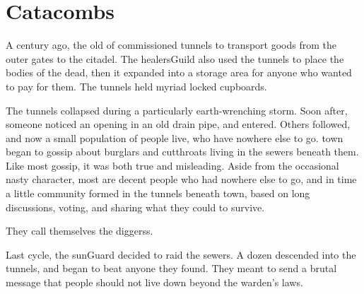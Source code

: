 \section{ Catacombs}
\label{sewers}


\begin{multicols}{2}

\begin{exampletext}
  \noindent
  A century ago, the old  of  commissioned tunnels to transport goods from the outer gates to the citadel.
  The \gls{healersGuild} also used the tunnels to place the bodies of the dead, then it expanded into a storage area for anyone who wanted to pay for them.
  The tunnels held myriad locked cupboards.


  The tunnels collapsed during a particularly earth-wrenching \gls{storm}.
  Soon after, someone noticed an opening in an old drain pipe, and entered.
  Others followed, and now a small population of people live, who have nowhere else to go.
  \Gls{town} began to gossip about burglars and cutthroats living in the sewers beneath them.
  Like most gossip, it was both true and misleading.
  Aside from the occasional nasty character, most are decent people who had nowhere else to go, and in time a little community formed in the tunnels beneath \gls{town}, based on long discussions, voting, and sharing what they could to survive.

  They call themselves the \glspl{diggers}.
\end{exampletext}

\begin{exampletext}
  \label{guardAttackHistory}
  Last \gls{cycle}, the \gls{sunGuard} decided to raid the sewers.
  A dozen descended into the tunnels, and began to beat anyone they found.
  They meant to send a brutal message that people should not live down beyond the \gls{warden}'s laws.


\end{exampletext}
\end{multicols}
